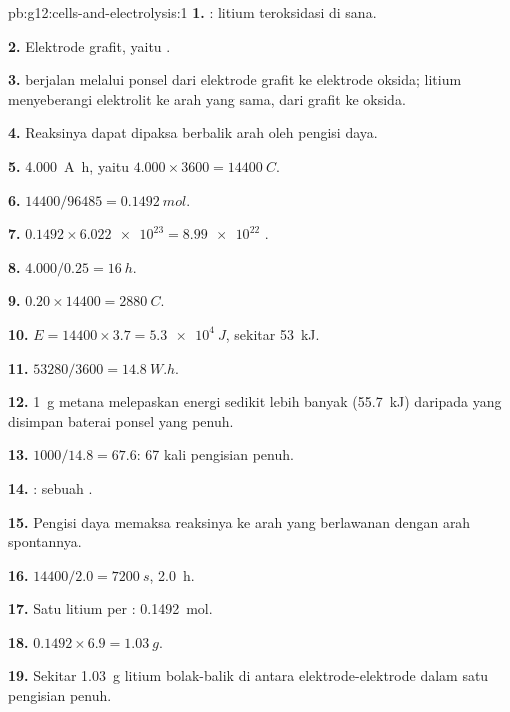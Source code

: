 \begin{solution}{pb:g12:cells-and-electrolysis:1}
\textbf{1.} : litium teroksidasi di sana.

\textbf{2.} Elektrode grafit, yaitu .

\textbf{3.}  berjalan melalui ponsel dari elektrode grafit ke
elektrode oksida;  litium menyeberangi elektrolit ke arah yang
sama, dari grafit ke oksida.

\textbf{4.} Reaksinya dapat dipaksa berbalik arah oleh pengisi daya.

\textbf{5.} \qty{4.000}{A.h}, yaitu $4.000 \times 3600 =
\qty{14400}{C}$.

\textbf{6.} $14400/96485 = \qty{0.1492}{mol}$.

\textbf{7.} $0.1492 \times \num{6.022e23} = \num{8.99e22}$ .

\textbf{8.} $4.000/0.25 = \qty{16}{h}$.

\textbf{9.} $0.20 \times 14400 = \qty{2880}{C}$.

\textbf{10.} $E = 14400 \times 3.7 = \qty{5.3e4}{J}$, sekitar
\qty{53}{kJ}.

\textbf{11.} $53280/3600 = \qty{14.8}{W.h}$.

\textbf{12.}  \qty{1}{g} metana melepaskan energi sedikit
lebih banyak (\qty{55.7}{kJ}) daripada yang disimpan baterai ponsel yang
penuh.

\textbf{13.} $1000/14.8 = 67.6$: 67 kali pengisian penuh.

\textbf{14.} : sebuah .

\textbf{15.} Pengisi daya memaksa reaksinya ke arah yang berlawanan
dengan arah spontannya.

\textbf{16.} $14400/2.0 = \qty{7200}{s}$, \qty{2.0}{h}.

\textbf{17.} Satu  litium per : \qty{0.1492}{mol}.

\textbf{18.} $0.1492 \times 6.9 = \qty{1.03}{g}$.

\textbf{19.} Sekitar \qty{1.03}{g} litium bolak-balik di antara
elektrode-elektrode dalam satu pengisian penuh.
\end{solution}
